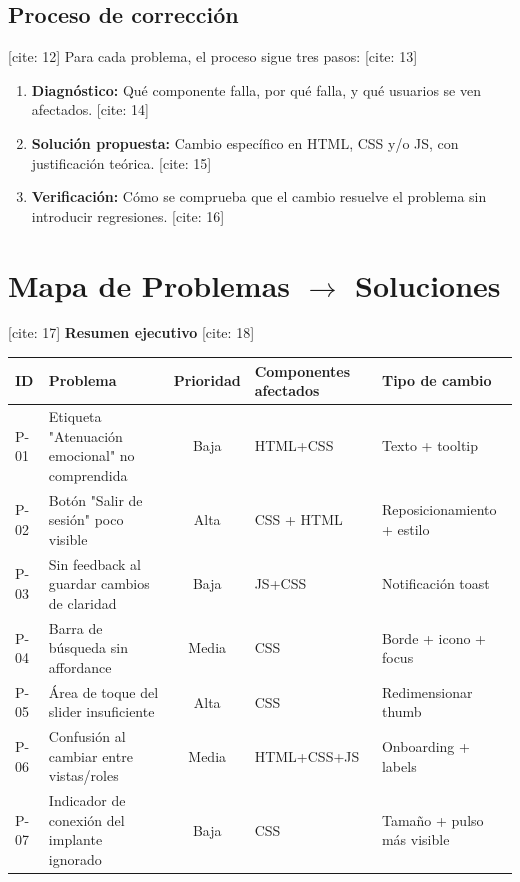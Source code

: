 \documentclass{article}
\begin{document}
\subsection{Proceso de corrección} [cite: 12]
Para cada problema, el proceso sigue tres pasos: [cite: 13]
\begin{enumerate}
    \item \textbf{Diagnóstico:} Qué componente falla, por qué falla, y qué usuarios se ven afectados. [cite: 14]
    \item \textbf{Solución propuesta:} Cambio específico en HTML, CSS y/o JS, con justificación teórica. [cite: 15]
    \item \textbf{Verificación:} Cómo se comprueba que el cambio resuelve el problema sin introducir regresiones. [cite: 16]
\end{enumerate}

\section{Mapa de Problemas $\rightarrow$ Soluciones} [cite: 17]
\textbf{Resumen ejecutivo} [cite: 18]

\begin{table}[h]
\centering
\begin{tabularx}{\textwidth}{llcXl}
\toprule
\textbf{ID} & \textbf{Problema} & \textbf{Prioridad} & \textbf{Componentes afectados} & \textbf{Tipo de cambio} \\ [cite: 19]
\midrule
P-01 & Etiqueta "Atenuación emocional" no comprendida & Baja & HTML+CSS & Texto + tooltip \\ [cite: 19]
P-02 & Botón "Salir de sesión" poco visible & Alta & CSS + HTML & Reposicionamiento + estilo \\ [cite: 19]
P-03 & Sin feedback al guardar cambios de claridad & Baja & JS+CSS & Notificación toast \\ [cite: 19]
P-04 & Barra de búsqueda sin affordance & Media & CSS & Borde + icono + focus \\ [cite: 19]
P-05 & Área de toque del slider insuficiente & Alta & CSS & Redimensionar thumb \\ [cite: 19]
P-06 & Confusión al cambiar entre vistas/roles & Media & HTML+CSS+JS & Onboarding + labels \\ [cite: 19]
P-07 & Indicador de conexión del implante ignorado & Baja & CSS & Tamaño + pulso más visible \\ [cite: 19]
\bottomrule
\end{tabularx}
\end{table}
\end{document}
